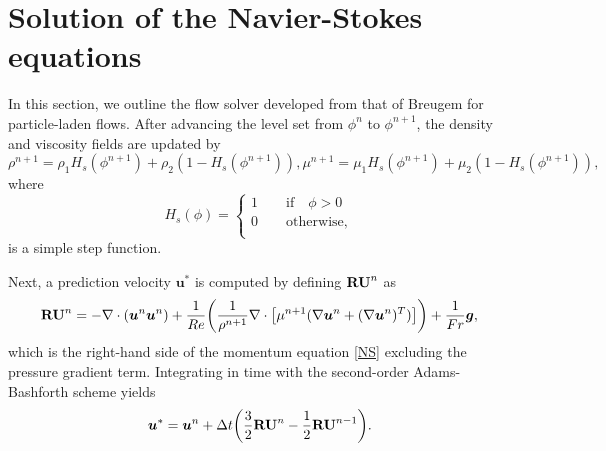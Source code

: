 

\section{Solution of the Navier-Stokes equations}
\label{subsec: NS}


In this section, we outline the flow solver developed from that of Breugem \cite{Wim-Paul_JCP_2012} for particle-laden flows. After advancing the level set from $\phi^{n}$ to $\phi^{n+1}$, the density and viscosity fields are updated by
\begin{subequations}
 \begin{equation}
  \rho^{n+1} = \rho_1 H_s(\phi^{n+1}) + \rho_2 (1-H_s(\phi^{n+1})), 
 \end{equation}
 \begin{equation}
  \mu^{n+1} = \mu_1 H_s(\phi^{n+1}) + \mu_2 (1-H_s(\phi^{n+1})), 
  \label{visc profile}
 \end{equation}
\end{subequations}
\noindent where
\begin{equation}
    H_s(\phi)=
    \begin{cases}
        1 \quad \quad \textrm{if} \quad \phi > 0 \\
        0 \quad \quad \textrm{otherwise}, \\
    \end{cases}
\end{equation}
\noindent is a simple step function.

Next, a prediction velocity ${\bm u}^*$ is computed by defining ${\bf RU}^n$ as
\begin{equation}
  {\bf RU}^n = -\nabla \cdot ({\bm u}^n {\bm u}^n)+\frac{1}{Re}\bigg(\frac{1}{\rho^{n+1}} \nabla \cdot \big[\mu^{n+1}(\nabla {\bm u}^n+(\nabla {\bm u}^n)^T)\big]\bigg)+\frac{1}{Fr}{\bm g},
  \label{ru}
\end{equation}
\noindent which is the right-hand side of the momentum equation \eqref{NS} excluding the pressure gradient term. Integrating in time with the second-order Adams-Bashforth scheme  yields
\begin{equation}
    {\bm u}^* ={\bm u}^n +\Delta t \bigg(\frac{3}{2} {\bf RU}^n-\frac{1}{2} {\bf RU}^{n-1} \bigg).
  \label{ab2}
\end{equation}

